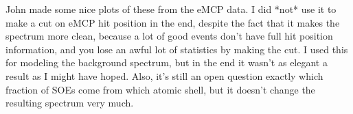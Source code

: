 John made some nice plots of these from the eMCP data.  I did *not* use it to make a cut on eMCP hit position in the end, despite the fact that it makes the spectrum more clean, because a lot of good events don't have full hit position information, and you lose an awful lot of statistics by making the cut.  I used this for modeling the background spectrum, but in the end it wasn't as elegant a result as I might have hoped.  Also, it's still an open question exactly which fraction of SOEs come from which atomic shell, but it doesn't change the resulting spectrum very much.

